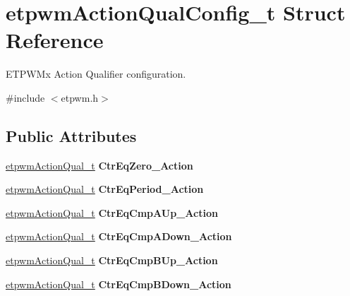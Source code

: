 \hypertarget{structetpwmActionQualConfig__t}{}\section{etpwm\+Action\+Qual\+Config\+\_\+t Struct Reference}
\label{structetpwmActionQualConfig__t}


E\+T\+P\+W\+Mx Action Qualifier configuration.  




{\ttfamily \#include $<$etpwm.\+h$>$}

\subsection*{Public Attributes}
\begin{DoxyCompactItemize}
\item 
\mbox{\label{structetpwmActionQualConfig__t_abc9dc4e37bef4f94e39b6bdd1372c9ec}} 
\mbox{\hyperlink{etpwm_8h_af381c9819d1969fe0a1b617ad2bf5a13}{etpwm\+Action\+Qual\+\_\+t}} {\bfseries Ctr\+Eq\+Zero\+\_\+\+Action}
\item 
\mbox{\label{structetpwmActionQualConfig__t_aac93a9b4fcd32774726e990d0ec6673f}} 
\mbox{\hyperlink{etpwm_8h_af381c9819d1969fe0a1b617ad2bf5a13}{etpwm\+Action\+Qual\+\_\+t}} {\bfseries Ctr\+Eq\+Period\+\_\+\+Action}
\item 
\mbox{\label{structetpwmActionQualConfig__t_a023dbca290effc43d30446de54de27b0}} 
\mbox{\hyperlink{etpwm_8h_af381c9819d1969fe0a1b617ad2bf5a13}{etpwm\+Action\+Qual\+\_\+t}} {\bfseries Ctr\+Eq\+Cmp\+A\+Up\+\_\+\+Action}
\item 
\mbox{\label{structetpwmActionQualConfig__t_ae4f2ef8bc839977b7e6c01e74f35e0e4}} 
\mbox{\hyperlink{etpwm_8h_af381c9819d1969fe0a1b617ad2bf5a13}{etpwm\+Action\+Qual\+\_\+t}} {\bfseries Ctr\+Eq\+Cmp\+A\+Down\+\_\+\+Action}
\item 
\mbox{\label{structetpwmActionQualConfig__t_a2cb99a147097d072712ee32833bdb2c3}} 
\mbox{\hyperlink{etpwm_8h_af381c9819d1969fe0a1b617ad2bf5a13}{etpwm\+Action\+Qual\+\_\+t}} {\bfseries Ctr\+Eq\+Cmp\+B\+Up\+\_\+\+Action}
\item 
\mbox{\label{structetpwmActionQualConfig__t_ade0a7a551b3df4bf15c2248cb35db777}} 
\mbox{\hyperlink{etpwm_8h_af381c9819d1969fe0a1b617ad2bf5a13}{etpwm\+Action\+Qual\+\_\+t}} {\bfseries Ctr\+Eq\+Cmp\+B\+Down\+\_\+\+Action}
\end{DoxyCompactItemize}


